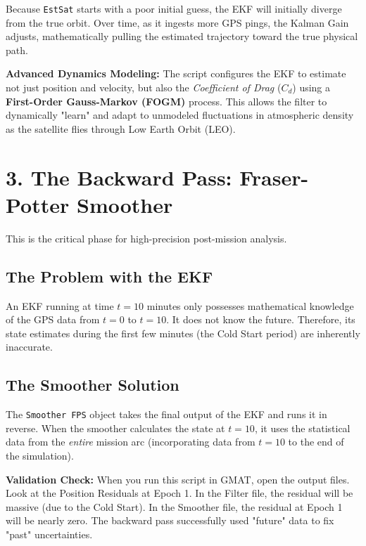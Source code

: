 \documentclass[11pt, letterpaper]{article}
\begin{document}
\begin{tcolorbox}[colback=white,colframe=UdeAGreen,title=\textbf{The EKF Objective}]
Because \texttt{EstSat} starts with a poor initial guess, the EKF will initially diverge from the true orbit. Over time, as it ingests more GPS pings, the Kalman Gain adjusts, mathematically pulling the estimated trajectory toward the true physical path.
\end{tcolorbox}

\noindent \textbf{Advanced Dynamics Modeling:} 
The script configures the EKF to estimate not just position and velocity, but also the \textit{Coefficient of Drag} ($C_d$) using a \textbf{First-Order Gauss-Markov (FOGM)} process. This allows the filter to dynamically "learn" and adapt to unmodeled fluctuations in atmospheric density as the satellite flies through Low Earth Orbit (LEO).

\section*{3. The Backward Pass: Fraser-Potter Smoother}
This is the critical phase for high-precision post-mission analysis. 

\subsection*{The Problem with the EKF}
An EKF running at time $t = 10$ minutes only possesses mathematical knowledge of the GPS data from $t=0$ to $t=10$. It does not know the future. Therefore, its state estimates during the first few minutes (the Cold Start period) are inherently inaccurate.

\subsection*{The Smoother Solution}
The \texttt{Smoother FPS} object takes the final output of the EKF and runs it in reverse. When the smoother calculates the state at $t=10$, it uses the statistical data from the \textit{entire} mission arc (incorporating data from $t=10$ to the end of the simulation). 

\vspace{0.3cm}
\noindent \textbf{Validation Check:} When you run this script in GMAT, open the output files. Look at the Position Residuals at Epoch 1. In the Filter file, the residual will be massive (due to the Cold Start). In the Smoother file, the residual at Epoch 1 will be nearly zero. The backward pass successfully used "future" data to fix "past" uncertainties.
\end{document}
